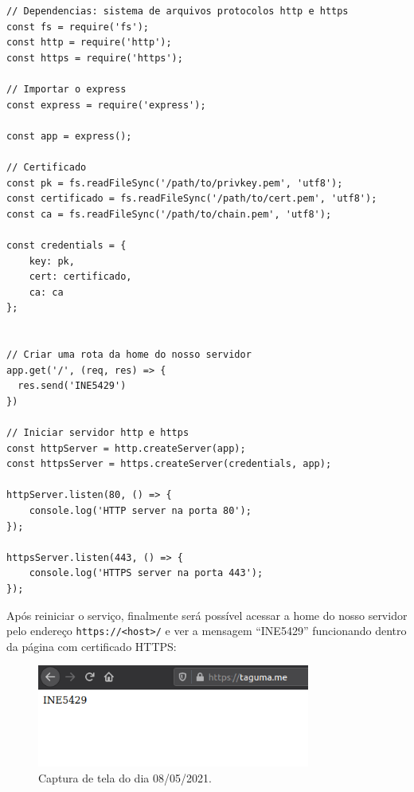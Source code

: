 \documentclass{article}
\begin{document}
\begin{verbatim}
// Dependencias: sistema de arquivos protocolos http e https
const fs = require('fs');
const http = require('http');
const https = require('https');

// Importar o express
const express = require('express');

const app = express();

// Certificado
const pk = fs.readFileSync('/path/to/privkey.pem', 'utf8');
const certificado = fs.readFileSync('/path/to/cert.pem', 'utf8');
const ca = fs.readFileSync('/path/to/chain.pem', 'utf8');

const credentials = {
	key: pk,
	cert: certificado,
	ca: ca
};


// Criar uma rota da home do nosso servidor
app.get('/', (req, res) => {
  res.send('INE5429')
})

// Iniciar servidor http e https
const httpServer = http.createServer(app);
const httpsServer = https.createServer(credentials, app);

httpServer.listen(80, () => {
	console.log('HTTP server na porta 80');
});

httpsServer.listen(443, () => {
	console.log('HTTPS server na porta 443');
});
\end{verbatim}

\newpage

Após reiniciar o serviço, finalmente será possível acessar a home do nosso servidor pelo endereço \texttt{https://<host>/} e ver a mensagem ``INE5429'' funcionando dentro da página com certificado HTTPS:

\begin{figure}[h!]
    \centering
    \includegraphics[width=0.8\textwidth]{seguranca.png}
    \caption{Captura de tela do dia 08/05/2021.}
\end{figure}
\end{document}
